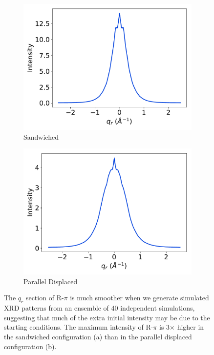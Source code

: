 \documentclass[journal=jpcbfk,manuscript=article]{achemso}
\begin{document}
  \begin{figure}[!htb]
  \centering
  \begin{subfigure}{0.45\textwidth}
  \includegraphics[width=\textwidth]{sandwiched_ensemble_rsection.pdf}
  \caption{Sandwiched}\label{fig:sandwiched_ensemble_rsection}
  \end{subfigure}
  \begin{subfigure}{0.45\textwidth}
  \includegraphics[width=\textwidth]{offset_ensemble_rsection.pdf}
  \caption{Parallel Displaced}\label{fig:offset_ensemble_rsection}
  \end{subfigure}
  \caption{The $q_r$ section of R-$\pi$ is much smoother when we generate simulated XRD
  		   patterns from an ensemble of 40 independent simulations, suggesting that much of the extra initial intensity may be due to the starting conditions. The maximum 
  		   intensity of R-$\pi$ is 3$\times$ higher in the sandwiched configuration (a)
  		   than in the parallel displaced configuration (b).}\label{fig:ensemble_XRD}
  \end{figure}
  
\end{document}

